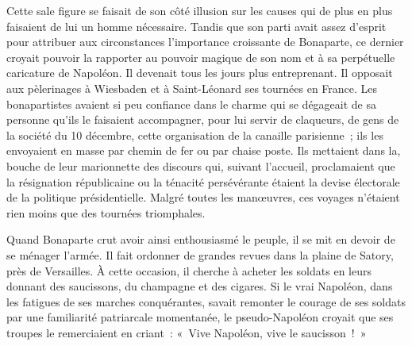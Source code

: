 \documentclass[french,twoside]{book} %
\begin{document}
Cette sale figure se faisait de son côté illusion sur les causes qui de plus en plus faisaient de lui un homme nécessaire. Tandis que son parti avait assez d’esprit pour attribuer aux circonstances l’importance croissante de Bonaparte, ce dernier croyait pouvoir la rapporter au pouvoir magique de son nom et à sa perpétuelle caricature de Napoléon. Il devenait tous les jours plus entreprenant. Il opposait aux pèlerinages à Wiesbaden et à Saint-Léonard ses tournées en France. Les bonapartistes avaient si peu confiance dans le charme qui se dégageait de sa personne qu’ils le faisaient accompagner, pour lui servir de claqueurs, de gens de la société du 10 décembre, cette organisation de la canaille parisienne ; ils les envoyaient en masse par chemin de fer ou par chaise poste. Ils mettaient dans la, bouche de leur marionnette des discours qui, suivant l’accueil, proclamaient que la résignation républicaine ou la ténacité persévérante étaient la devise électorale de la politique présidentielle. Malgré toutes les manœuvres, ces voyages n’étaient rien moins que des tournées triomphales.\par
Quand Bonaparte crut avoir ainsi enthousiasmé le peuple, il se mit en devoir de se ménager l’armée. Il fait ordonner de grandes revues dans la plaine de Satory, près de Versailles. À cette occasion, il cherche à acheter les soldats en leurs donnant des saucissons, du champagne et des cigares. Si le vrai Napoléon, dans les fatigues de ses marches conquérantes, savait remonter le courage de ses soldats par une familiarité patriarcale momentanée, le pseudo-Napoléon croyait que ses troupes le remerciaient en criant : « Vive Napoléon, vive le saucisson ! »\par
\end{document}
